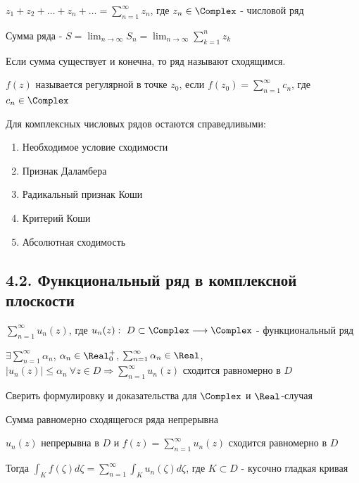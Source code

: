 \documentclass[12pt]{article}
\begin{document}
\hypertarget{complex_series}{}

 $z_1 + z_2 + \dots + z_n + \dots = \sum_{n = 1}^\infty z_n$, где $z_n \in \Complex$ - числовой ряд

 Сумма ряда - $S = \lim_{n \to \infty} S_n = \lim_{n \to \infty} \sum_{k = 1}^n z_k$

Если сумма существует и конечна, то ряд называют сходящимся. 

\Def $f(z)$ называется регулярной в точке $z_0$, если $f(z_0) = \sum_{n = 1}^\infty c_n$, где $c_n \in \Complex$

\Nota Для комплексных числовых рядов остаются справедливыми:

\begin{enumerate}
    \item Необходимое условие сходимости
    \item Признак Даламбера
    \item Радикальный признак Коши
    \item Критерий Коши
    \item Абсолютная сходимость
\end{enumerate}

\subsection{4.2. Функциональный ряд в комплексной плоскости}

\Def $\sum_{n = 1}^\infty u_n(z)$, где $u_n(z) : \ D \subset \Complex \longrightarrow \Complex$ - функциональный ряд

\begin{MyTheorem}

    $\exists \sum_{n = 1}^\infty \alpha_n$, $\alpha_n \in \Real_0^+$, $\sum_{n = 1}^\infty \alpha_n \in \Real$,
    $|u_n(z)| \leq \alpha_n \ \forall z \in D \Longrightarrow \sum_{n = 1}^\infty u_n(z)$ сходится равномерно в $D$
\end{MyTheorem}

\Lab Сверить формулировку и доказательства для $\Complex$ и $\Real$-случая 

\Nota Сумма равномерно сходящегося ряда непрерывна

\begin{MyTheorem}
    \Ths $u_n(z)$ непрерывна в $D$ и $f(z) = \sum_{n = 1}^\infty u_n(z)$ сходится равномерно в $D$

    Тогда $\int_K f(\zeta) d\zeta = \sum_{n = 1}^\infty \int_K u_n(\zeta) d\zeta$, где $K \subset D$ - кусочно гладкая кривая
\end{MyTheorem}
\end{document}
